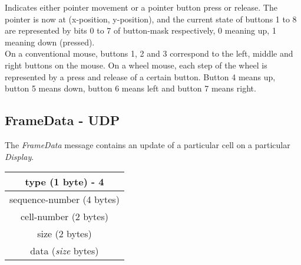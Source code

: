 \documentclass[11pt o]{article}
\begin{document}
    Indicates either pointer movement or a pointer button press or release. The pointer is now at (x-position, y-position), and the current state of buttons 1 to 8 are represented by bits 0 to 7 of button-mask respectively, 0 meaning up, 1 meaning down (pressed).\\

    On a conventional mouse, buttons 1, 2 and 3 correspond to the left, middle and right buttons on the mouse. On a wheel mouse, each step of the wheel is represented by a press and release of a certain button. Button 4 means up, button 5 means down, button 6 means left and button 7 means right.

    \subsection{FrameData - UDP}
    The \emph{FrameData} message contains an update of a particular cell on a particular \emph{Display}.

    \begin{center}
        \begin{tabular}{|c|}
            \hline
            type (1 byte) - 4         \\
            \hline
            sequence-number (4 bytes) \\
            \hline
            cell-number (2 bytes)     \\
            \hline
            size (2 bytes)            \\
            \hline
            data (\emph{size} bytes)  \\
            \hline
        \end{tabular}
    \end{center}
\end{document}
